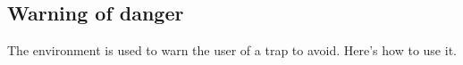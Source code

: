 \documentclass[10pt, a4paper]{article}
\begin{document}
\subsection{Warning of danger}

The  environment is used to warn the user of a trap to avoid. Here's how to use it.

\end{document}
